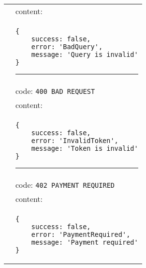 \begin{adjustwidth}{1cm}{}
\begin{longtable}{|c|l|}
              &                     content: \\
              & \begin{minipage}[t]{0.7\textwidth}
                \begin{adjustwidth}{1.5cm}{}
                \begin{verbatim}
{
    success: false, 
    error: 'BadQuery',
    message: 'Query is invalid'
}
                \end{verbatim}
                \end{adjustwidth}
                 \par\noindent\rule{\textwidth}{1pt}
                 \vspace{4pt}
              \end{minipage} \\
              &                     code: \texttt{400 BAD REQUEST} \\
              &                     content: \\
              & \begin{minipage}[t]{0.7\textwidth}
                \begin{adjustwidth}{1.5cm}{}
                \begin{verbatim}
{
    success: false, 
    error: 'InvalidToken',
    message: 'Token is invalid'
}
                \end{verbatim}
                \end{adjustwidth}
                \par\noindent\rule{\textwidth}{1pt}
                 \vspace{4pt}
              \end{minipage} \\
              &                     code: \texttt{402 PAYMENT REQUIRED} \\
              &                     content: \\
              & \begin{minipage}[t]{0.7\textwidth}
                \begin{adjustwidth}{1.5cm}{}
                \begin{verbatim}
{
    success: false, 
    error: 'PaymentRequired',
    message: 'Payment required'
}
                \end{verbatim}
                \end{adjustwidth}
              \end{minipage} \\
              \hline

\end{longtable}
\end{adjustwidth}
